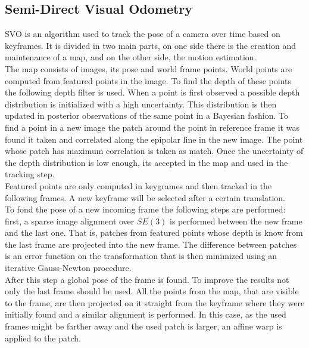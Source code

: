 \subsection{Semi-Direct Visual Odometry}
\label{ssub:semi_direct_visual_odometry}

SVO is an algorithm used to track the pose of a camera over time based on keyframes. It is divided in two main parts, on one side there is the creation and maintenance of a map, and on the other side, the motion estimation. \\

The map consists of images, its pose and world frame points. World points are computed from featured points in the image. To find the depth of these points the following depth filter is used. When a point is first observed a possible depth distribution is initialized with a high uncertainty. This distribution is then updated in posterior observations of the same point in a Bayesian fashion. To find a point in a new image the patch around the point in reference frame it was found it taken and correlated along the epipolar line in the new image. The point whose patch has maximum correlation is taken as match. Once the uncertainty of the depth distribution is low enough, its accepted in the map and used in the tracking step.\\

Featured points are only computed in keygrames and then tracked in the following frames. A new keyframe will be selected after a certain translation.\\

To fond the pose of a new incoming frame the following steps are performed: first, a sparse image alignment over $SE(3)$ is performed between the new frame and the last one. That is, patches from featured points whose depth is know from the last frame are projected into the new frame. The difference between patches is an error function on the transformation that is then minimized using an iterative Gauss-Newton procedure.\\

After this step a global pose of the frame is found. To improve the results not only the last frame should be used. All the points from the map, that are visible to the frame, are then projected on it straight from the keyframe where they were initially found and a similar alignment is performed. In this case, as the used frames might be farther away and the used patch is larger, an affine warp is applied to the patch. \\

